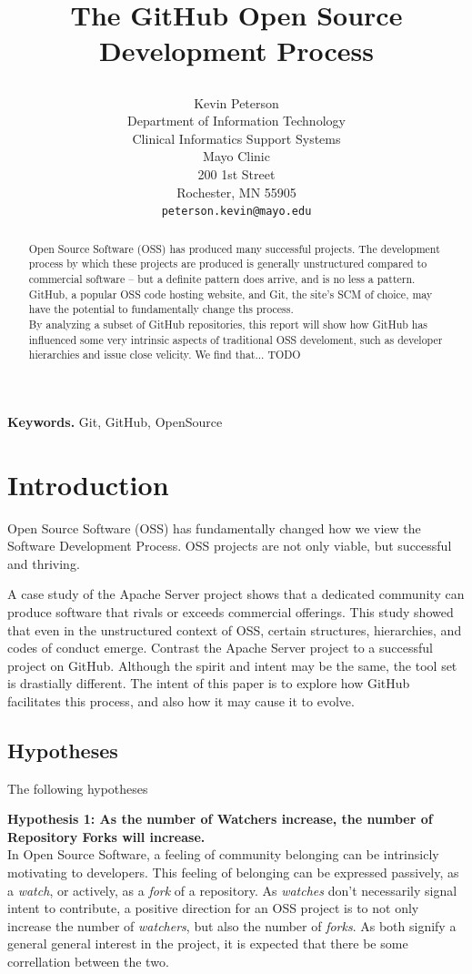 \documentclass{proc}
\title{
The GitHub Open Source Development Process
\author{Kevin Peterson\\
Department of Information Technology\\
Clinical Informatics Support Systems\\
Mayo Clinic\\
200 1st Street\\
Rochester, MN  55905\\
\small \texttt{peterson.kevin@mayo.edu}
}
}
\begin{document}
\maketitle

\begin{abstract}
Open Source Software (OSS) has produced many successful projects. The development process by which these projects are produced is generally unstructured compared to commercial software -- but a definite pattern does arrive, and is no less a pattern. GitHub, a popular OSS code hosting website, and Git, the site's SCM of choice, may have the potential to fundamentally change ths process.\\
By analyzing a subset of GitHub repositories, this report will show how GitHub has influenced some very intrinsic aspects of traditional OSS develoment, such as developer hierarchies and issue close velicity. We find that... TODO
\end{abstract}

\noindent \textbf{Keywords.} Git, GitHub, OpenSource

\section{Introduction}
Open Source Software (OSS) has fundamentally changed how we view the Software Development Process\cite{raymond1999cathedral}. OSS projects are not only viable, but successful and thriving. 

A case study of the Apache Server project\cite{mockus2000case} shows that a dedicated community can produce software that rivals or exceeds commercial offerings. This study showed that even in the unstructured context of OSS, certain structures, hierarchies, and codes of conduct emerge. Contrast the Apache Server project to a successful project on GitHub. Although the spirit and intent may be the same, the tool set is drastially different. The intent of this paper is to explore how GitHub facilitates this process, and also how it may cause it to evolve.

\subsection{Hypotheses}
The following hypotheses

\textbf{Hypothesis 1: As the number of Watchers increase, the number of Repository Forks will increase.}\\
In Open Source Software, a feeling of community belonging can be intrinsicly motivating to developers\cite{lakhani2003hackers}. This feeling of belonging can be expressed passively, as a \emph{watch}, or actively, as a \emph{fork} of a repository. As \emph{watches} don't necessarily signal intent to contribute, a positive direction for an OSS project is to not only increase the number of \emph{watchers}, but also the number of \emph{forks}. As both signify a general general interest in the project, it is expected that there be some correllation between the two.\\
\end{document}
